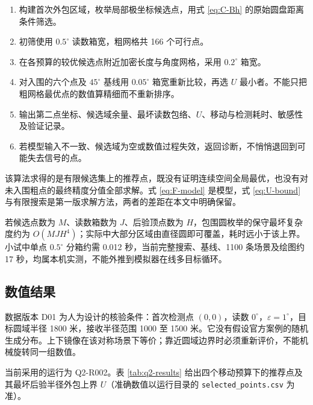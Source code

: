 \begin{enumerate}[label=(\arabic*),leftmargin=2.2em]
  \item 构建首次外包区域，枚举局部极坐标候选点，用式 \eqref{eq:C-Bh} 的原始圆盘距离条件筛选。
  \item 初筛使用 $0.5^\circ$ 读数箱宽，粗网格共 166 个可行点。
  \item 在各预算的较优候选点附近加密长度与角度网格，采用 $0.2^\circ$ 箱宽。
  \item 对入围的六个点及 $45^\circ$ 基线用 $0.05^\circ$ 箱宽重新比较，再选 $U$ 最小者。不能只把粗网格最优点的数值算精细而不重新排序。
  \item 输出第二点坐标、候选域余量、最坏读数包络、$U$、移动与检测耗时、敏感性及验证记录。
  \item 若模型输入不一致、候选域为空或数值过程失效，返回诊断，不悄悄退回到可能失去信号的点。
\end{enumerate}

该算法求得的是有限候选集上的推荐点，既没有证明连续空间全局最优，也没有对未入围粗点的最终精度分值全部求解。式 \eqref{eq:F-model} 是模型，式 \eqref{eq:U-bound} 与有限搜索是第一版求解方法，两者的差距在本文中明确保留。

若候选点数为 $M$、读数箱数为 $J$、后验顶点数为 $H$，包围圆枚举的保守最坏复杂度约为 $O(MJH^4)$；实际中大部分区域由直径圆即可覆盖，耗时远小于该上界。小试中单点 $0.5^\circ$ 分箱约需 0.012 秒，当前完整搜索、基线、1100 条场景及绘图约 17 秒，均属本机实测，不能外推到模拟器在线多目标循环。

\subsection{数值结果}

数据版本 D01 为人为设计的核验条件：首次检测点 $(0,0)$，读数 $0^\circ$，$\varepsilon=1^\circ$，目标圆域半径 1800 米，接收半径范围 1000 至 1500 米。它没有假设官方案例的随机生成分布。上下镜像在该对称场景下等价；靠近圆域边界时必须重新评价，不能机械旋转同一组数值。

当前采用的运行为 Q2-R002。表 \ref{tab:q2-results} 给出四个移动预算下的推荐点及其最坏后验半径外包上界 $U$（准确数值以运行目录的 \texttt{selected\_points.csv} 为准）。

